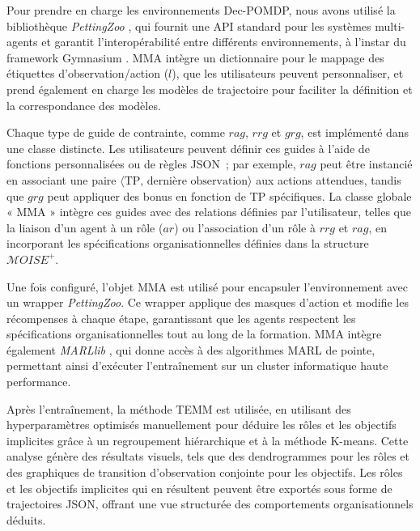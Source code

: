 
Pour prendre en charge les environnements Dec-POMDP, nous avons utilisé la bibliothèque \textit{PettingZoo} \cite{terry2020pettingzoo}, qui fournit une API standard pour les systèmes multi-agents et garantit l'interopérabilité entre différents environnements, à l'instar du framework Gymnasium \cite{kwiatkowski2024}. MMA intègre un dictionnaire pour le mappage des étiquettes d'observation/action ($l$), que les utilisateurs peuvent personnaliser, et prend également en charge les modèles de trajectoire  pour faciliter la définition et la correspondance des modèles.

Chaque type de guide de contrainte, comme $rag$, $rrg$ et $grg$, est implémenté dans une classe distincte. Les utilisateurs peuvent définir ces guides à l'aide de fonctions personnalisées ou de règles JSON~; par exemple, $rag$ peut être instancié en associant une paire $\langle \text{TP, dernière observation} \rangle$ aux actions attendues, tandis que $grg$ peut appliquer des bonus en fonction de TP spécifiques. La classe globale « MMA » intègre ces guides avec des relations définies par l'utilisateur, telles que la liaison d'un agent à un rôle ($ar$) ou l'association d'un rôle à $rrg$ et $rag$, en incorporant les spécifications organisationnelles définies dans la structure $\mathcal{M}OISE^+$.

Une fois configuré, l'objet MMA est utilisé pour encapsuler l'environnement avec un wrapper \textit{PettingZoo}. Ce wrapper applique des masques d'action et modifie les récompenses à chaque étape, garantissant que les agents respectent les spécifications organisationnelles tout au long de la formation. MMA intègre également \textit{MARLlib} \cite{hu2021marlib}, qui donne accès à des algorithmes MARL de pointe, permettant ainsi d'exécuter l'entraînement sur un cluster informatique haute performance.

Après l'entraînement, la méthode TEMM est utilisée, en utilisant des hyperparamètres optimisés manuellement pour déduire les rôles et les objectifs implicites grâce à un regroupement hiérarchique et à la méthode K-means. Cette analyse génère des résultats visuels, tels que des dendrogrammes pour les rôles et des graphiques de transition d'observation conjointe pour les objectifs. Les rôles et les objectifs implicites qui en résultent peuvent être exportés sous forme de trajectoires JSON, offrant une vue structurée des comportements organisationnels déduits.


